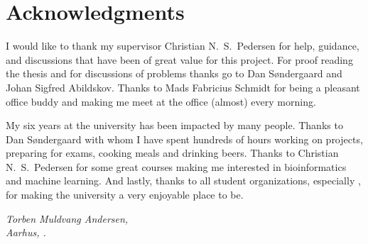 \chapter{Acknowledgments}

I would like to thank my supervisor Christian N.\ S.\ Pedersen for help,
guidance, and discussions that have been of great value for this project. For
proof reading the thesis and for discussions of problems thanks go to Dan
Søndergaard and Johan Sigfred Abildskov. Thanks to Mads Fabricius Schmidt for
being a pleasant office buddy and making me meet at the office (almost) every
morning.

My six years at the university has been impacted by many people. Thanks to Dan
Søndergaard with whom I have spent hundreds of hours working on projects,
preparing for exams, cooking meals and drinking beers. Thanks to Christian N.\
S.\ Pedersen for some great courses making me interested in bioinformatics and
machine learning. And lastly, thanks to all student organizations, especially
\TKET{}, for making the university a very enjoyable place to be.

\vspace{2ex}
\begin{flushright}
  \emph{Torben Muldvang Andersen,}\\
  \emph{Aarhus, .}
\end{flushright}

